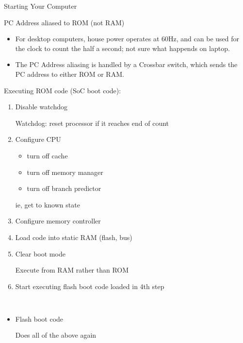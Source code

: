\begin{Lecture}{Starting Your Computer}
\begin{frame}[fragile]
\begin{itemize}
\begin{itemize}
 PC Address aliased to ROM (not RAM)

\end{itemize}
\end{itemize}
\BNotes\ifnum{}
\begin{itemize}
\item For desktop computers, house power operates at 60Hz, and can be used
	for the clock to count the half a second; not sure what happends on
	laptop.
\item The PC Address aliasing is handled by a Crossbar switch, which sends
	the PC address to either ROM or RAM.
\end{itemize}
\fi\ENotes
\end{frame}

\begin{frame}[fragile]
Executing ROM code (SoC boot code):
\begin{enumerate}
		\item Disable watchdog

	   Watchdog: reset processor if it reaches end of count

		\item Configure CPU
		\begin{itemize}
		    \item turn off cache
		   	\item turn off memory manager
		    \item turn off branch predictor
		\end{itemize}
		   ie, get to known state

		\item Configure memory controller

		\item Load code into static RAM (flash, bus)

		\item Clear boot mode
			   
				Execute from RAM rather than ROM

		\item Start executing flash boot code loaded in 4th step
\end{enumerate}
\BNotes\ifnum{}
~
\fi\ENotes
\end{frame}

\begin{frame}[fragile]
\begin{itemize}
	\item Flash boot code

		 Does all of the above again


\end{itemize}
\end{frame}
\end{Lecture}
